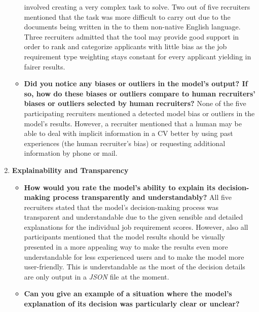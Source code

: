\documentclass[draft,final]{thesisclass} %
\begin{document}
\begin{enumerate}
\begin{itemize}
involved creating a very complex task to solve. Two out of five recruiters mentioned that the task was more difficult to carry out due to the documents being written in the to them non-native English language. Three recruiters admitted that the tool may provide good support in order to rank and categorize applicants with little bias as the job requirement type weighting stays constant for every applicant yielding in fairer results.
        \item \textbf{Did you notice any biases or outliers in the model's output? If so, how do these biases or outliers compare to human recruiters' biases or outliers selected by human recruiters?}
        None of the five participating recruiters mentioned a detected model bias or outliers in the model's results. However, a recruiter mentioned that a human may be able to deal with implicit information in a \acs{CV} better by using past experiences (the human recruiter's bias) or requesting additional information by phone or mail.
    \end{itemize}
    \item \textbf{Explainability and Transparency}
    \begin{itemize}
        \item \textbf{How would you rate the model's ability to explain its decision-making process transparently and understandably?}
        All five recruiters stated that the model's decision-making process was transparent and understandable due to the given sensible and detailed explanations for the individual job requirement scores. However, also all participants mentioned that the model results should be visually presented in a more appealing way to make the results even more understandable for less experienced users and to make the model more user-friendly. This is understandable as the most of the decision details are only output in a \textit{JSON} file at the moment.
        \item \textbf{Can you give an example of a situation where the model's explanation of its decision was particularly clear or unclear?}

\end{itemize}
\end{enumerate}
\end{document}
